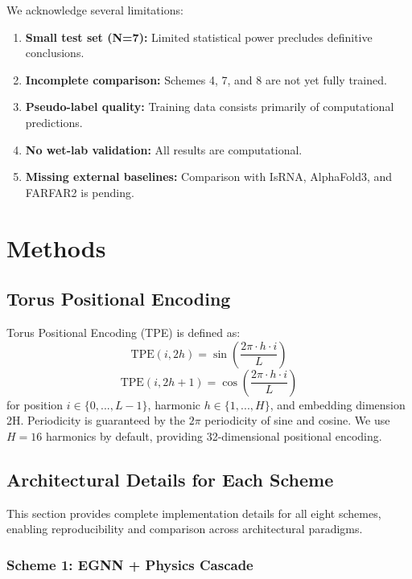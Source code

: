 \documentclass[12pt]{article}
\begin{document}
We acknowledge several limitations:
\begin{enumerate}
\item \textbf{Small test set (N=7):} Limited statistical power precludes definitive conclusions.
\item \textbf{Incomplete comparison:} Schemes 4, 7, and 8 are not yet fully trained.
\item \textbf{Pseudo-label quality:} Training data consists primarily of computational predictions.
\item \textbf{No wet-lab validation:} All results are computational.
\item \textbf{Missing external baselines:} Comparison with IsRNA, AlphaFold3, and FARFAR2 is pending.
\end{enumerate}

\section{Methods}

\subsection{Torus Positional Encoding}

Torus Positional Encoding (TPE) is defined as:
\begin{equation}
\text{TPE}(i, 2h) = \sin\left(\frac{2\pi \cdot h \cdot i}{L}\right)
\end{equation}
\begin{equation}
\text{TPE}(i, 2h+1) = \cos\left(\frac{2\pi \cdot h \cdot i}{L}\right)
\end{equation}
for position $i \in \{0, ..., L-1\}$, harmonic $h \in \{1, ..., H\}$, and embedding dimension 2H. Periodicity is guaranteed by the $2\pi$ periodicity of sine and cosine. We use $H = 16$ harmonics by default, providing 32-dimensional positional encoding.

\subsection{Architectural Details for Each Scheme}

This section provides complete implementation details for all eight schemes, enabling reproducibility and comparison across architectural paradigms.

\subsubsection{Scheme 1: EGNN + Physics Cascade}
\end{document}
